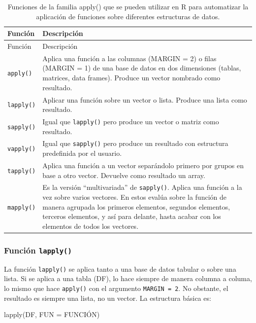 \documentclass[
]{article}
\newenvironment{Shaded}{\begin{snugshade}}{\end{snugshade}}
\newcommand{\AttributeTok}[1]{\textcolor[rgb]{0.77,0.63,0.00}{#1}}
\newcommand{\FunctionTok}[1]{\textcolor[rgb]{0.00,0.00,0.00}{#1}}
\newcommand{\NormalTok}[1]{#1}
\theoremstyle{definition}
\theoremstyle{definition}
\theoremstyle{definition}
\theoremstyle{definition}
\theoremstyle{remark}
\begin{document}
\begin{longtable}[]{@{}ll@{}}
\caption{\label{tab:unnamed-chunk-49}Funciones de la familia apply() que se pueden utilizar en R para automatizar la aplicación de funciones sobre diferentes estructuras de datos.}\tabularnewline
\toprule()
Función & Descripción \\
\midrule()
\endfirsthead
\toprule()
Función & Descripción \\
\midrule()
\endhead
\texttt{apply()} & Aplica una función a las columnas (MARGIN = 2) o filas (MARGIN = 1) de una base de datos en dos dimensiones (tablas, matrices, data frames). Produce un vector nombrado como resultado. \\
\texttt{lapply()} & Aplicar una función sobre un vector o lista. Produce una lista como resultado. \\
\texttt{sapply()} & Igual que \texttt{lapply()} pero produce un vector o matriz como resultado. \\
\texttt{vapply()} & Igual que \texttt{sapply()} pero produce un resultado con estructura predefinida por el usuario. \\
\texttt{tapply()} & Aplica una función a un vector separándolo primero por grupos en base a otro vector. Devuelve como resultado un array. \\
\texttt{mapply()} & Es la versión ``multivariada'' de \texttt{sapply()}. Aplica una función a la vez sobre varios vectores. En estos evalúa sobre la función de manera agrupada los primeros elementos, segundos elementos, terceros elementos, y así para delante, hasta acabar con los elementos de todos los vectores. \\
\bottomrule()
\end{longtable}

\hypertarget{funciuxf3n-lapply}{%
\subsubsection{\texorpdfstring{Función \texttt{lapply()}}{Función lapply()}}\label{funciuxf3n-lapply}}

La función \texttt{lapply()} se aplica tanto a una base de datos tabular o sobre una lista. Si se aplica a una tabla (DF), lo hace siempre de manera columna a columa, lo mismo que hace \texttt{apply()} con el argumento \texttt{MARGIN\ =\ 2}. No obstante, el resultado es siempre una lista, no un vector. La estructura básica es:

\begin{Shaded}
\begin{Highlighting}[]
\FunctionTok{lapply}\NormalTok{(DF,  }\AttributeTok{FUN =}\NormalTok{ FUNCIÓN)}
\end{Highlighting}
\end{Shaded}
\end{document}
